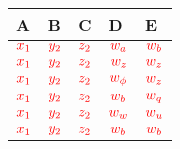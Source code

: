 \documentclass{article}
\begin{document}
\parbox{.25\linewidth}{
\begin{flushright}
  \begin{tabular}{lllll}
  	\hline
    A & B & C & D & E\\
    \hline
    \multicolumn{1}{|c|}{$\textcolor{myred}{x_1}$} & \multicolumn{1}{c|}{$\textcolor{myred}{y_2}$} & \multicolumn{1}{c|}{$\textcolor{myred}{z_2}$} & \multicolumn{1}{c|}{$\textcolor{myred}{w_a}$} & \multicolumn{1}{c|}{$\textcolor{myred}{w_b}$}\\ \hline
    \multicolumn{1}{|c|}{$\textcolor{myred}{x_1}$} & \multicolumn{1}{c|}{$\textcolor{myred}{y_2}$} & \multicolumn{1}{c|}{$\textcolor{myred}{z_2}$} & \multicolumn{1}{c|}{$\textcolor{myred}{w_z}$} & \multicolumn{1}{c|}{$\textcolor{myred}{w_z}$}\\ \hline
    \multicolumn{1}{|c|}{$\textcolor{myred}{x_1}$} & \multicolumn{1}{c|}{$\textcolor{myred}{y_2}$} & \multicolumn{1}{c|}{$\textcolor{myred}{z_2}$} & \multicolumn{1}{c|}{$\textcolor{myred}{w_\phi}$} & \multicolumn{1}{c|}{$\textcolor{myred}{w_z}$}\\ \hline
    \multicolumn{1}{|c|}{$\textcolor{myred}{x_1}$} & \multicolumn{1}{c|}{$\textcolor{myred}{y_2}$} & \multicolumn{1}{c|}{$\textcolor{myred}{z_2}$} & \multicolumn{1}{c|}{$\textcolor{myred}{w_b}$} & \multicolumn{1}{c|}{$\textcolor{myred}{w_q}$}\\ \hline
    \multicolumn{1}{|c|}{$\textcolor{myred}{x_1}$} & \multicolumn{1}{c|}{$\textcolor{myred}{y_2}$} & \multicolumn{1}{c|}{$\textcolor{myred}{z_2}$} & \multicolumn{1}{c|}{$\textcolor{myred}{w_w}$} & \multicolumn{1}{c|}{$\textcolor{myred}{w_u}$}\\ \hline
    \multicolumn{1}{|c|}{$\textcolor{myred}{x_1}$} & \multicolumn{1}{c|}{$\textcolor{myred}{y_2}$} & \multicolumn{1}{c|}{$\textcolor{myred}{z_2}$} & \multicolumn{1}{c|}{$\textcolor{myred}{w_b}$} & \multicolumn{1}{c|}{$\textcolor{myred}{w_b}$}\\ \hline


\end{tabular}
\end{flushright}}
\end{document}
